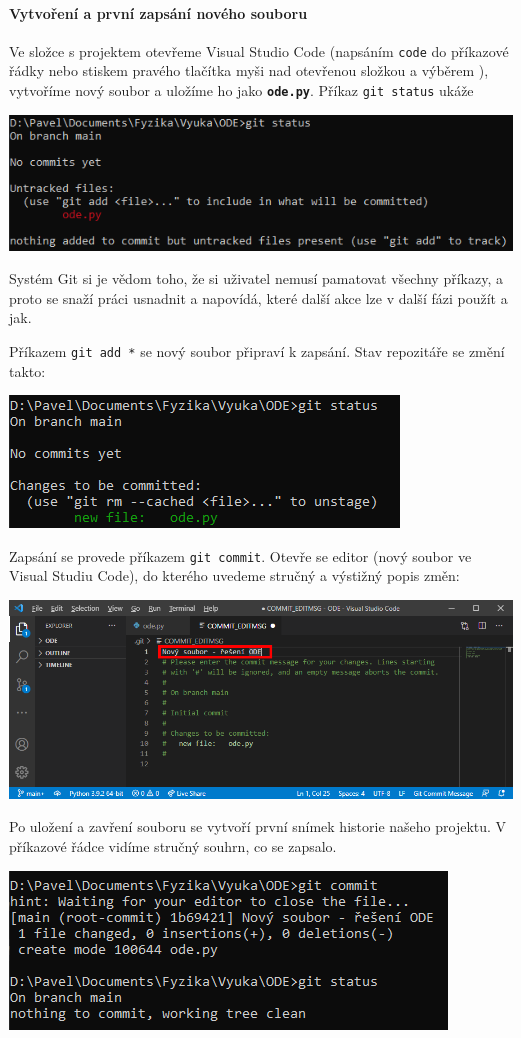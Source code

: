 \documentclass[a4paper,11pt,twoside]{article}
\newcommand{\subsubsubsection}[1]{\paragraph{#1}\mbox{}

}
\def\code#1{\textnormal{\texttt{#1}}}
\def\file#1{\textnormal{\textbf{\texttt{#1}}}}
\theoremstyle{red}
\theoremstyle{green}
\begin{document}
\subsubsubsection{Vytvoření a první zapsání nového souboru}
    Ve složce s projektem otevřeme Visual Studio Code (napsáním \code{code} do příkazové řádky nebo stiskem pravého tlačítka myši nad otevřenou složkou a výběrem ), vytvoříme nový soubor a uložíme ho jako \file{ode.py}.
    Příkaz \code{git status} ukáže
    \begin{center}\includegraphics[width=0.7\linewidth]{GitStatusFirst.png}\end{center}
    Systém Git si je vědom toho, že si uživatel nemusí pamatovat všechny příkazy, a proto se snaží práci usnadnit a napovídá, které další akce lze v další fázi použít a jak.

    Příkazem \code{git add *} se nový soubor připraví k zapsání.
    Stav repozitáře se změní takto:
    \begin{center}\includegraphics[width=0.45\linewidth]{GitStatusAdd.png}\end{center}

    Zapsání se provede příkazem \code{git commit}.
    Otevře se editor (nový soubor ve Visual Studiu Code), do kterého uvedeme stručný a výstižný popis změn:
    \begin{center}\includegraphics[width=0.9\linewidth]{VSCodeCommit.png}\end{center}
    Po uložení a zavření souboru se vytvoří první snímek historie našeho projektu.
    V příkazové řádce vidíme stručný souhrn, co se zapsalo.
    \begin{center}\includegraphics[width=0.5\linewidth]{GitStatusCommit.png}\end{center}
\end{document}
